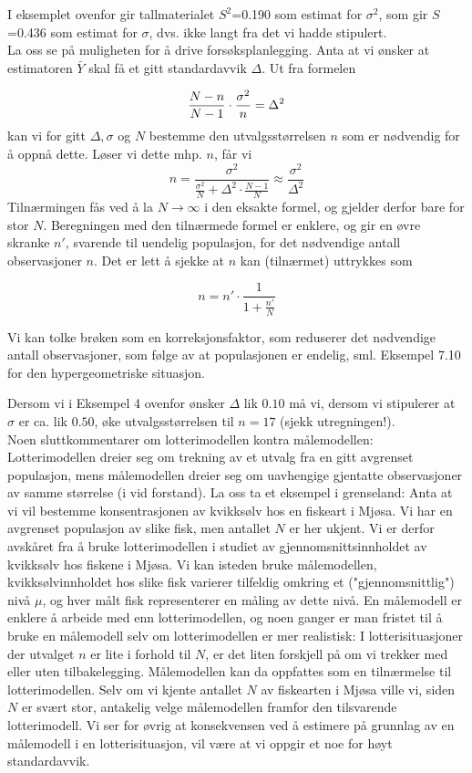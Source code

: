 I eksemplet ovenfor gir tallmaterialet $S^2$=0.190 som
estimat for $\sigma ^2$, som gir $S$=0.436 som estimat for $\sigma$,
dvs. ikke langt fra det vi hadde stipulert. \\[0.1cm]

La oss se på muligheten for å drive
forsøksplanlegging. Anta at vi ønsker at estimatoren $\bar
Y$ skal få et gitt standardavvik $\Delta$. Ut fra formelen

     \[{N-n\over N-1}\cdot{\sigma ^2\over n }= \Delta ^2\]
kan vi for gitt $\Delta,\sigma$ og $N$ bestemme den
utvalgsstørrelsen $n$ som er nødvendig for å oppnå dette.
Løser vi dette mhp. $n$, får vi
\[ n=\frac{\sigma^2}{\frac{\sigma^2}{N}+\Delta^2\cdot \frac{N-1}{N}}
                               \approx  \frac{\sigma^2}{\Delta^2}  \]
Tilnærmingen fås ved å la $N \rightarrow \infty$ i den eksakte
formel, og gjelder derfor bare for stor $N$. Beregningen med den
tilnærmede formel er enklere, og gir en øvre skranke $n'$,
svarende til uendelig populasjon, for det nødvendige antall
observasjoner $n$. Det er lett å sjekke at $n$ kan (tilnærmet)
uttrykkes som

\[  n=n'\cdot \frac{1}{1+\frac{n'}{N}} \] 

\noindent Vi kan tolke brøken som en korreksjonsfaktor, som reduserer
det nødvendige antall observasjoner, som følge av at
populasjonen er endelig, sml. Eksempel 7.10 for den hypergeometriske situasjon.


Dersom vi i Eksempel 4 ovenfor
ønsker $\Delta$ lik $0.10$ må vi, dersom vi stipulerer at
$\sigma$ er ca. lik $0.50$, øke utvalgsstørrelsen til
$n=17$ (sjekk utregningen!).\\

Noen sluttkommentarer om lotterimodellen kontra målemodellen:\\
Lotterimodellen dreier seg om trekning av et utvalg fra en gitt
avgrenset populasjon, mens målemodellen dreier seg om
uavhengige gjentatte observasjoner av samme størrelse (i vid
forstand). La oss ta et eksempel i grenseland: Anta at vi vil
bestemme konsentrasjonen av kvikksølv hos en fiskeart i
Mjøsa. Vi har en avgrenset populasjon av slike fisk, men
antallet $N$ er her ukjent. Vi er derfor avskåret fra å
bruke lotterimodellen i studiet av gjennomsnittsinnholdet av
kvikksølv hos fiskene i Mjøsa. Vi kan isteden bruke
målemodellen, kvikksølvinnholdet hos slike fisk varierer
tilfeldig omkring et ("gjennomsnittlig") nivå $\mu$, og hver
målt fisk representerer en måling av dette nivå. En
målemodell er enklere å arbeide med enn lotterimodellen,
og noen ganger er man fristet til å bruke en målemodell
selv om  lotterimodellen er mer realistisk: I lotterisituasjoner
der utvalget $n$ er lite i forhold til $N$, er det liten
forskjell på om vi trekker med eller uten tilbakelegging.
Målemodellen kan da oppfattes som en tilnærmelse til
lotterimodellen. Selv om vi kjente antallet $N$ av fiskearten i
Mjøsa ville vi, siden $N$ er svært stor, antakelig velge
målemodellen framfor den tilsvarende lotterimodell. Vi ser
for øvrig at konsekvensen ved å estimere på grunnlag
av en målemodell i en lotterisituasjon, vil være at vi
oppgir et noe for høyt standardavvik. \\[0.1cm]

